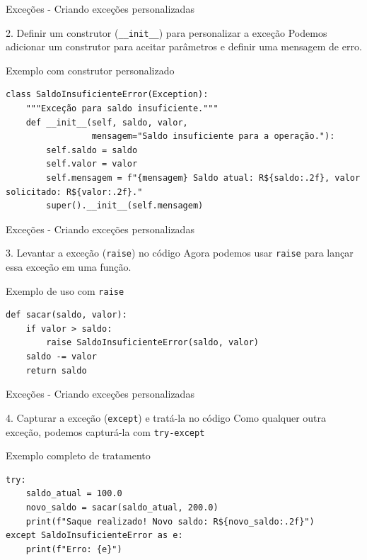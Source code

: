 \begin{frame}[fragile]{Exceções - Criando exceções personalizadas}

    \begin{block}{2. Definir um construtor (\texttt{\_\_init\_\_}) para personalizar a exceção}
        Podemos adicionar um construtor para aceitar parâmetros e definir uma mensagem de erro.
    \end{block}

    \begin{exampleblock}{Exemplo com construtor personalizado}
        \begin{verbatim}
class SaldoInsuficienteError(Exception):
    """Exceção para saldo insuficiente."""
    def __init__(self, saldo, valor, 
                 mensagem="Saldo insuficiente para a operação."):
        self.saldo = saldo
        self.valor = valor
        self.mensagem = f"{mensagem} Saldo atual: R${saldo:.2f}, valor 
solicitado: R${valor:.2f}."
        super().__init__(self.mensagem)
\end{verbatim}
    \end{exampleblock}


\end{frame}

\begin{frame}[fragile]{Exceções - Criando exceções personalizadas}

    \begin{block}{3. Levantar a exceção (\texttt{raise}) no código}
        Agora podemos usar \texttt{raise} para lançar essa exceção em uma função.
    \end{block}

    \begin{exampleblock}{Exemplo de uso com \texttt{raise}}
        \begin{verbatim}
def sacar(saldo, valor):
    if valor > saldo:
        raise SaldoInsuficienteError(saldo, valor)
    saldo -= valor
    return saldo
\end{verbatim}
    \end{exampleblock}

\end{frame}


\begin{frame}[fragile]{Exceções - Criando exceções personalizadas}

    \begin{block}{4. Capturar a exceção (\texttt{except}) e tratá-la no código}
        Como qualquer outra exceção, podemos capturá-la com \texttt{try-except}
    \end{block}

    \begin{exampleblock}{Exemplo completo de tratamento}
        \begin{verbatim}
try:
    saldo_atual = 100.0
    novo_saldo = sacar(saldo_atual, 200.0)
    print(f"Saque realizado! Novo saldo: R${novo_saldo:.2f}")
except SaldoInsuficienteError as e:
    print(f"Erro: {e}")
\end{verbatim}
    \end{exampleblock}


\end{frame}

